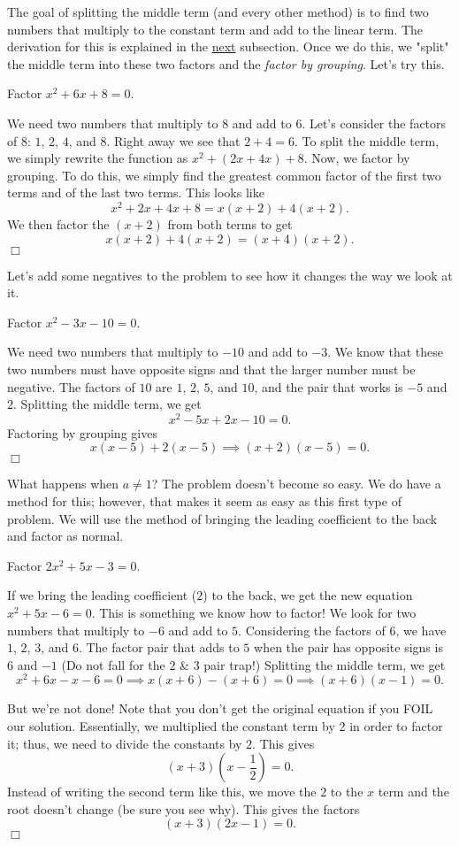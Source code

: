 \documentclass[lang=en,11pt]{elegantbook}
\begin{document}
The goal of splitting the middle term (and every other method) is to find two numbers that multiply to the constant term and add to the linear term.  The derivation for this is explained in the \hyperlink{section.5.5.2}{next} subsection.  Once we do this, we "split" the middle term into these two factors and the \textit{factor by grouping}.  Let's try this.
\begin{example}
Factor $x^2+6x+8=0$.
\end{example}
\begin{solution}
We need two numbers that multiply to $8$ and add to $6$.  Let's consider the factors of $8$: $1$, $2$, $4$, and $8$.  Right away we see that $2+4=6$.  To split the middle term, we simply rewrite the function as $x^2+\left(2x+4x\right)+8$.  Now, we factor by grouping.  To do this, we simply find the greatest common factor of the first two terms and of the last two terms.  This looks like $$x^2+2x+4x+8=x(x+2)+4(x+2).$$  We then factor the $(x+2)$ from both terms to get $$x(x+2)+4(x+2)=(x+4)(x+2).$$ $\Box$
\end{solution}
Let's add some negatives to the problem to see how it changes the way we look at it.
\begin{example}
Factor $x^2-3x-10=0$.
\end{example}
\begin{solution}
We need two numbers that multiply to $-10$ and add to $-3$.  We know that these two numbers must have opposite signs and that the larger number must be negative.  The factors of $10$ are $1$, $2$, $5$, and $10$, and the pair that works is $-5$ and $2$.  Splitting the middle term, we get $$x^2-5x+2x-10=0.$$  Factoring by grouping gives $$x(x-5)+2(x-5) \implies (x+2)(x-5)=0.$$ $\Box$
\end{solution}
What happens when $a\neq 1$?  The problem doesn't become so easy.  We do have a method for this; however, that makes it seem as easy as this first type of problem.  We will use the method of bringing the leading coefficient to the back and factor as normal.
\begin{example}
Factor $2x^2+5x-3=0$.
\end{example}
\begin{solution}
If we bring the leading coefficient ($2$) to the back, we get the new equation $x^2+5x-6=0$.  This is something we know how to factor!  We look for two numbers that multiply to $-6$ and add to $5$.  Considering the factors of $6$, we have $1$, $2$, $3$, and $6$.  The factor pair that adds to $5$ when the pair has opposite signs is $6$ and $-1$ (Do not fall for the $2$ \& $3$ pair trap!)  Splitting the middle term, we get $$x^2+6x-x-6=0 \implies x(x+6)-(x+6)=0 \implies (x+6)(x-1)=0.$$  

But we're not done!  Note that you don't get the original equation if you FOIL our solution.  Essentially, we multiplied the constant term by 2 in order to factor it; thus, we need to divide the constants by $2$.  This gives $$\left(x+3\right)\left(x-\dfrac{1}{2}\right)=0.$$  Instead of writing the second term like this, we move the $2$ to the $x$ term and the root doesn't change (be sure you see why).  This gives the factors $$(x+3)(2x-1)=0.$$ $\Box$
\end{solution}
\end{document}
